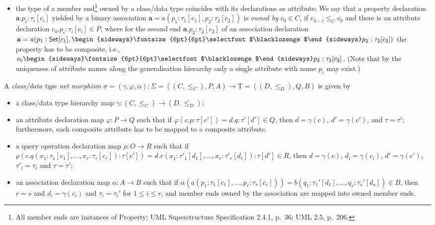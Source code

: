 \documentclass[10pt,fleqn,final]{scrreprt}
\newenvironment{definitions}[0]{\medskip }{}
\newcommand{\uml}[1]{\textsf{#1}}
\newcommand{\composition}{\raisebox{0.2pt}{\begin{sideways}\fontsize{6pt}{6pt}\selectfont$\blacklozenge$\end{sideways}}}
\newcommand{\Tau}{\mathrm{T}}
\begin{document}
\begin{definitions}
\begin{itemize}[label={--}, leftmargin=*]
  \item the type of a member end\footnote{All member ends are instances
  of \uml{Property}; UML Superstructure Specification 2.4.1, p.~36; UML
  2.5, p.~206.}  owned by a class/data type coincides with its
declarations as attribute: We say that a property declaration
$\mathbf{a}.p_i : \tau_i[c_i]$
yielded by a binary association
$\mathbf{a} = a(p_1 : \tau_1[c_1], p_2 : \tau_2[c_2])$
is \emph{owned by} $c_0 \in C$,
if $c_{3-i} \leq_C c_0$
and there is an attribute declaration $c_0.p_i : \tau_i[c_i] \in P$,
where for the second end $\mathbf{a}.p_2 : \tau_2[c_2]$
of an association declaration
$\mathbf{a} = a(p_1 : \mathsf{Set}[c_1], \composition p_2 :
\tau_2[c_2])$ the property has to be composite, i.e.,
$c_0\composition p_2 : \tau_2[c_2]$.
(Note that by the uniqueness of attribute names along the generalisation
hierarchy only a single attribute with name $p_i$ may exist.)
\end{itemize}

A \emph{class/data type net morphism}
$\sigma = (\gamma, \varphi, \alpha) : \Sigma = ((C,
{\leq}_C), P, A) \to \Tau = ((D, {\leq}_D),\allowbreak
Q,\allowbreak B)$ is given by
%
\begin{itemize}[label={--}, leftmargin=*]
  \item a class/data type hierarchy map $\gamma : (C, {\leq_C}) \to (D,
{\leq_D})$;

  \item an attribute declaration map $\varphi : P \to Q$ such that if
$\varphi({c.p : \tau[c']}) = {d.q : \tau'[d']} \in Q$, then
$d = \gamma(c)$, $d' = \gamma(c')$, and $\tau = \tau'$; furthermore,
each composite attribute has to be mapped to a composite attribute.

  \item a query operation declaration map $\rho : O \to R$ such that if
$\rho(c.q(x_1 : \tau_1[c_1], \dots, x_r : \tau_r[c_r]) : \tau[c']) =
d.r(x_1 : \tau'_1[d_1], \dots, x_r : \tau'_r[d_r]) : \tau[d'] \in R$, 
then $d = \gamma(c)$, $d_i = \gamma(c_i)$, 
$d' = \gamma(c')$, $\tau'_i = \tau_i$ and $\tau = \tau'$;

  \item an association declaration map $\alpha : A \to B$ such that if
$\alpha(a(p_1 : \tau_1[c_1], \dots, p_r : \tau_r[c_r])) = b(q_1 :
\tau_1'[d_1], \dots, q_s : \tau_s'[d_s]) \in B$,
then $r = s$ and $d_i = \gamma(c_i)$ and $\tau_i = \tau_i'$ for
$1 \leq i \leq r$, and member ends owned by the association are mapped
into owned member ends.
\end{itemize}


\end{definitions}
\end{document}
